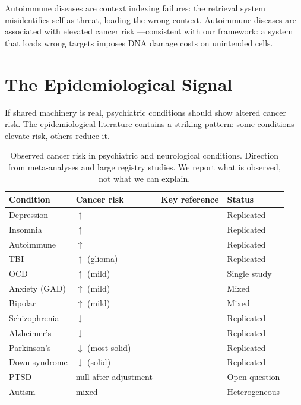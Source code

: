 \documentclass[11pt]{article}
\theoremstyle{definition}
\begin{document}
Autoimmune diseases are context indexing failures: the retrieval
system misidentifies self as threat, loading the wrong context.
Autoimmune diseases are associated with elevated cancer risk
\cite{Franks2012}---consistent with our framework: a system that
loads wrong targets imposes DNA damage costs on unintended cells.

\section{The Epidemiological Signal}
\label{sec:signal}

If shared machinery is real, psychiatric conditions should show
altered cancer risk. The epidemiological literature contains
a striking pattern: some conditions elevate risk, others reduce it.

\begin{table}[ht]
\centering
\caption{Observed cancer risk in psychiatric and neurological
conditions. Direction from meta-analyses and large registry
studies. We report what is observed, not what we can explain.}
\label{tab:signal}
\small
\begin{tabular}{@{}llll@{}}
\toprule
\textbf{Condition} & \textbf{Cancer risk} &
\textbf{Key reference} & \textbf{Status} \\
\midrule
Depression & $\uparrow$ & \cite{Chida2008} & Replicated \\
Insomnia & $\uparrow$ & \cite{Lu2017} & Replicated \\
Autoimmune & $\uparrow$ & \cite{Franks2012} & Replicated \\
TBI & $\uparrow$ (glioma) & \cite{Chen2012tbi} & Replicated \\
OCD & $\uparrow$ (mild) & \cite{Shen2013} & Single study \\
Anxiety (GAD) & $\uparrow$ (mild) & \cite{Batty2017} & Mixed \\
Bipolar & $\uparrow$ (mild) & \cite{McGinty2012} & Mixed \\
\midrule
Schizophrenia & $\downarrow$ & \cite{Catts2008, Ji2013} & Replicated \\
Alzheimer's & $\downarrow$ & \cite{Driver2012, Musicco2013} & Replicated \\
Parkinson's & $\downarrow$ (most solid) & \cite{Bajaj2010} & Replicated \\
Down syndrome & $\downarrow$ (solid) & \cite{Hasle2000} & Replicated \\
\midrule
PTSD & null after adjustment & \cite{Gradus2015} & Open question \\
Autism & mixed & \cite{Darbro2016} & Heterogeneous \\
\bottomrule
\end{tabular}
\end{table}
\end{document}
